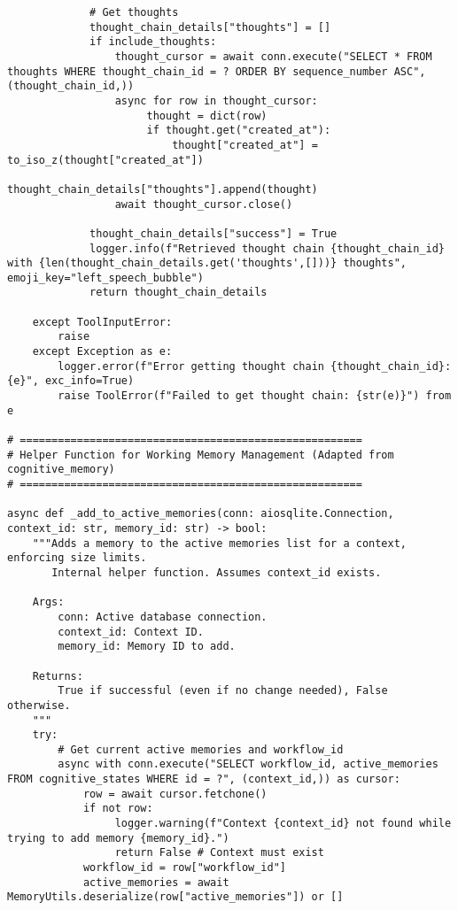 \documentclass[12pt,a4paper]{article}
\begin{document}
\begin{pageablecode}
\begin{verbatim}
             # Get thoughts
             thought_chain_details["thoughts"] = []
             if include_thoughts:
                 thought_cursor = await conn.execute("SELECT * FROM thoughts WHERE thought_chain_id = ? ORDER BY sequence_number ASC", (thought_chain_id,))
                 async for row in thought_cursor:
                      thought = dict(row)
                      if thought.get("created_at"):
                          thought["created_at"] = to_iso_z(thought["created_at"])
                      thought_chain_details["thoughts"].append(thought)
                 await thought_cursor.close()

             thought_chain_details["success"] = True
             logger.info(f"Retrieved thought chain {thought_chain_id} with {len(thought_chain_details.get('thoughts',[]))} thoughts", emoji_key="left_speech_bubble")
             return thought_chain_details

    except ToolInputError:
        raise
    except Exception as e:
        logger.error(f"Error getting thought chain {thought_chain_id}: {e}", exc_info=True)
        raise ToolError(f"Failed to get thought chain: {str(e)}") from e

# ======================================================
# Helper Function for Working Memory Management (Adapted from cognitive_memory)
# ======================================================

async def _add_to_active_memories(conn: aiosqlite.Connection, context_id: str, memory_id: str) -> bool:
    """Adds a memory to the active memories list for a context, enforcing size limits.
       Internal helper function. Assumes context_id exists.

    Args:
        conn: Active database connection.
        context_id: Context ID.
        memory_id: Memory ID to add.

    Returns:
        True if successful (even if no change needed), False otherwise.
    """
    try:
        # Get current active memories and workflow_id
        async with conn.execute("SELECT workflow_id, active_memories FROM cognitive_states WHERE id = ?", (context_id,)) as cursor:
            row = await cursor.fetchone()
            if not row:
                 logger.warning(f"Context {context_id} not found while trying to add memory {memory_id}.")
                 return False # Context must exist
            workflow_id = row["workflow_id"]
            active_memories = await MemoryUtils.deserialize(row["active_memories"]) or []


\end{verbatim}
\end{pageablecode}
\end{document}

